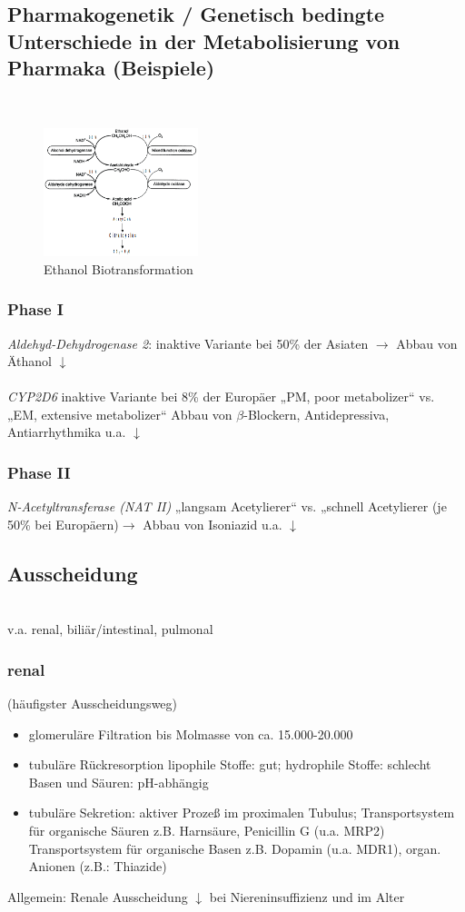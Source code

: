 \documentclass[10pt,a4paper]{report}
\begin{document}
\subsection{Pharmakogenetik / Genetisch bedingte Unterschiede in der Metabolisierung von Pharmaka (Beispiele)} \mbox{} \\
\begin{figure}[h]
	\centering 
	\includegraphics[width=0.4\textwidth]{ethanolbiotransformation.png} 
	\caption{Ethanol Biotransformation} 
	\label{fig:EthanolBiotransformation}
\end{figure}
\subsubsection{Phase I} 
\textit{Aldehyd-Dehydrogenase 2}: inaktive Variante bei 50\% der Asiaten $\rightarrow$ Abbau von Äthanol $\downarrow$\\ \\
\textit{CYP2D6} 	inaktive Variante bei 8\% der Europäer „PM, poor metabolizer“ vs. „EM, extensive metabolizer“ Abbau von $\beta$-Blockern, Antidepressiva, Antiarrhythmika u.a. $\downarrow$
\subsubsection{Phase II}
\textit{N-Acetyltransferase (NAT II)}		„langsam Acetylierer“ vs. „schnell Acetylierer (je 50\% bei Europäern)$\rightarrow$ Abbau von Isoniazid u.a. $\downarrow$
\subsection{Ausscheidung} \mbox{} \\
v.a. renal, biliär/intestinal, pulmonal
\subsubsection{renal}
(häufigster Ausscheidungsweg)
\begin{itemize}
	\item glomeruläre Filtration bis Molmasse von ca. 15.000-20.000
	\item tubuläre Rückresorption lipophile Stoffe: gut; hydrophile Stoffe: schlecht Basen und Säuren: pH-abhängig
	\item tubuläre Sekretion: aktiver Prozeß im proximalen Tubulus; Transportsystem für organische Säuren z.B. Harnsäure, Penicillin G (u.a. MRP2) Transportsystem für organische Basen z.B. Dopamin (u.a. MDR1), organ. Anionen (z.B.: Thiazide)
\end{itemize}
Allgemein: Renale Ausscheidung $\downarrow$ bei Niereninsuffizienz und im Alter
\end{document}
